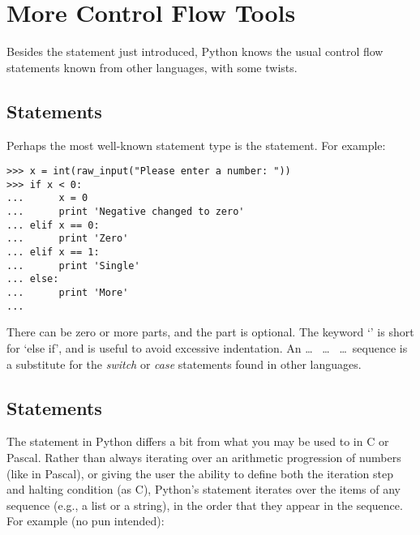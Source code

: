 \documentclass{manual}
\begin{document}
\chapter{More Control Flow Tools \label{moreControl}}

Besides the  statement just introduced, Python knows
the usual control flow statements known from other languages, with
some twists.

\section{ Statements \label{if}}

Perhaps the most well-known statement type is the
 statement.  For example:

\begin{verbatim}
>>> x = int(raw_input("Please enter a number: "))
>>> if x < 0:
...      x = 0
...      print 'Negative changed to zero'
... elif x == 0:
...      print 'Zero'
... elif x == 1:
...      print 'Single'
... else:
...      print 'More'
... 
\end{verbatim}

There can be zero or more  parts, and the
 part is optional.  The keyword `' is
short for `else if', and is useful to avoid excessive indentation.  An 
 \ldots\  \ldots\  \ldots\ sequence
is a substitute for the  \emph{switch} or
\emph{case} statements found in other languages.


\section{ Statements \label{for}}

The  statement in Python differs a bit from
what you may be used to in C or Pascal.  Rather than always
iterating over an arithmetic progression of numbers (like in Pascal),
or giving the user the ability to define both the iteration step and
halting condition (as C), Python's
 statement iterates over the items of any
sequence (e.g., a list or a string), in the order that they appear in
the sequence.  For example (no pun intended):
\end{document}
